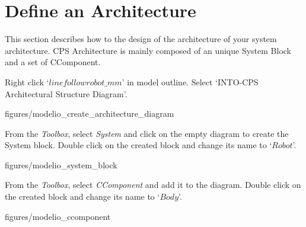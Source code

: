 \documentclass[11pt,a4paper]{../tutorial}
\begin{document}
 \newpage

\section{Define an Architecture}
\label{sec:obj_def}

This section describes how to the design of the architecture of your system architecture.  CPS Architecture is mainly composed of an unique System Block and a set of CComponent.


\begin{instructions}
\item Right click `$linefollowrobot\_mm$' in model outline. Select `INTO-CPS \menusep Architectural Structure Diagram'.

\begin{center}
\begin{annotation}[width=0.7\linewidth]{figures/modelio_create_architecture_diagram}
    \end{annotation}
\end{center}

\newpage

\item From the \emph{Toolbox}, select \emph{System} and click on the empty diagram to create the System block. Double click on the created block and change its name to `$Robot$'.

\begin{center}
\begin{annotation}[width=0.7\linewidth]{figures/modelio_system_block}
    \end{annotation}
\end{center}

\item \label{start_ccomponent_instructions} From the \emph{Toolbox}, select \emph{CComponent} and add it to the diagram. Double click on the created block and change its name to `$Body$'.

\begin{center}
\begin{annotation}[width=0.7\linewidth]{figures/modelio_ccomponent}
    \end{annotation}
\end{center}


\end{instructions}
\end{document}
